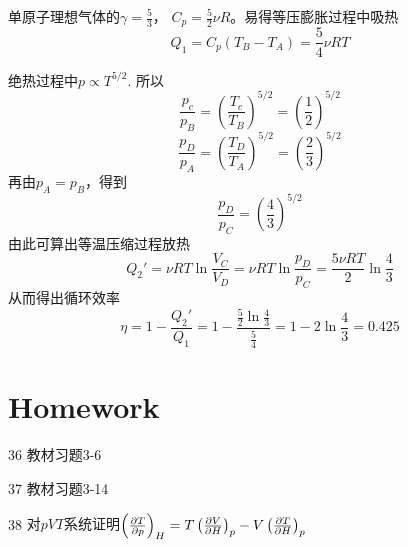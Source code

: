 \documentclass[CJK]{beamer}
\begin{document}
\begin{frame}
  \bch
  {\scriptsize
  单原子理想气体的$\gamma = \frac{5}{3}$， $C_p = \frac{5}{2}\nu R$。易得等压膨胀过程中吸热
  $$Q_1 = C_p(T_B-T_A) = \frac{5}{4}\nu R T$$

  绝热过程中$p \propto T^{5/2}$.
  所以
  $$\frac{p_c}{p_B} = \left(\frac{T_c}{T_B}\right)^{5/2} = \left(\frac{1}{2}\right)^{5/2}$$
  $$\frac{p_D}{p_A} =\left(\frac{T_D}{T_A}\right)^{5/2} = \left(\frac{2}{3}\right)^{5/2}$$
  再由$p_A=p_B$，得到
  $$\frac{p_D}{p_C} =   \left(\frac{4}{3}\right)^{5/2}$$
  由此可算出等温压缩过程放热
  $$ Q_2' = \nu R T \ln \frac{V_C}{V_D} = \nu R T \ln \frac{p_D}{p_C} = \frac{5\nu RT}{2} \ln\frac{4}{3} $$
  从而得出循环效率
  $$\eta = 1 - \frac{Q_2'}{Q_1} = 1 - \frac{\frac{5}{2}\ln\frac{4}{3}}{\frac{5}{4}} = 1-2\ln\frac{4}{3} = 0.425 $$
  }
  \ech
\end{frame}


\section{Homework}

\begin{frame}
  \bch
  {\small 
  \bitem
\item[36]{教材习题3-6}
\item[37]{教材习题3-14}
\item[38]{对$pVT$系统证明$\left(\frac{\partial T}{\partial p}\right)_{H} = T \left(\frac{\partial V}{\partial H}\right)_{p} - V\left(\frac{\partial T}{\partial H}\right)_{p}$}
  \eitem
  }
  \ech
\end{frame}
\end{document}
